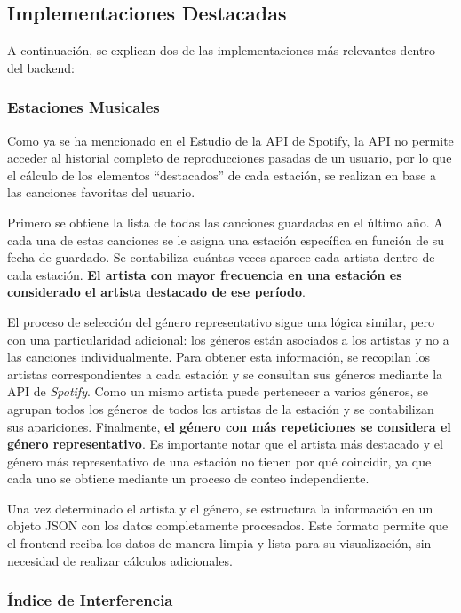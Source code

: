 \subsection{Implementaciones Destacadas}
A continuación, se explican dos de las implementaciones más relevantes dentro del backend:

\subsubsection*{Estaciones Musicales}

Como ya se ha mencionado en el \hyperref[sec:estudio_api_tracks]{Estudio de la API de Spotify}, la API no permite acceder al historial completo de reproducciones pasadas de un usuario, por lo que el cálculo de los elementos ``destacados'' de cada estación, se realizan en base a las canciones favoritas del usuario.

Primero se obtiene la lista de todas las canciones guardadas en el último año. A cada una de estas canciones se le asigna una estación específica en función de su fecha de guardado. Se contabiliza cuántas veces aparece cada artista dentro de cada estación. \textbf{El artista con mayor frecuencia en una estación es considerado el artista destacado de ese período}.

El proceso de selección del género representativo sigue una lógica similar, pero con una particularidad adicional: los géneros están asociados a los artistas y no a las canciones individualmente. Para obtener esta información, se recopilan los artistas correspondientes a cada estación y se consultan sus géneros mediante la API de \textit{Spotify}. Como un mismo artista puede pertenecer a varios géneros, se agrupan todos los géneros de todos los artistas de la estación y se contabilizan sus apariciones. Finalmente, \textbf{el género con más repeticiones se considera el género representativo}. Es importante notar que el artista más destacado y el género más representativo de una estación no tienen por qué coincidir, ya que cada uno se obtiene mediante un proceso de conteo independiente.

Una vez determinado el artista y el género, se estructura la información en un objeto JSON con los datos completamente procesados. Este formato permite que el frontend reciba los datos de manera limpia y lista para su visualización, sin necesidad de realizar cálculos adicionales.

\newpage

\subsubsection*{Índice de Interferencia}

